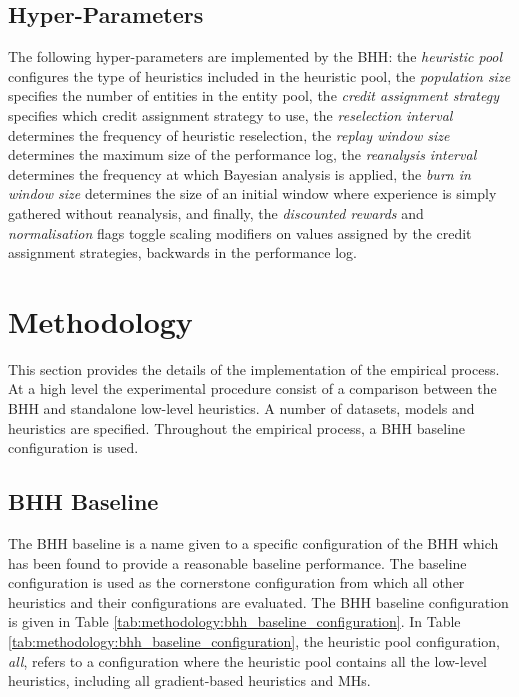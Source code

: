 \documentclass[preprint,review,12pt]{elsarticle}
\begin{document}
\subsection{Hyper-Parameters}\label{sec:bhh:hyper_parameters}

The following hyper-parameters are implemented by the \acs{BHH}: the \textit{heuristic pool} configures the type of heuristics included in the heuristic pool, the \textit{population size} specifies the number of entities in the entity pool, the \textit{credit assignment strategy} specifies which credit assignment strategy to use, the \textit{reselection interval} determines the frequency of heuristic reselection, the \textit{replay window size} determines the maximum size of the performance log, the \textit{reanalysis interval} determines the frequency at which Bayesian analysis is applied, the \textit{burn in window size} determines the size of an initial window where experience is simply gathered without reanalysis, and finally, the \textit{discounted rewards} and \textit{normalisation} flags toggle scaling modifiers on values assigned by the credit assignment strategies, backwards in the performance log.



\section{Methodology}
\label{sec:methodology}

This section provides the details of the implementation of the empirical process. At a high level the experimental procedure consist of a comparison between the \acs{BHH} and standalone low-level heuristics. A number of datasets, models and heuristics are specified. Throughout the empirical process, a \acs{BHH} baseline configuration is used.

\subsection{BHH Baseline}\label{sec:methodology:baseline_bhh}

The \acs{BHH} baseline is a name given to a specific configuration of the \acs{BHH} which has been found to provide a reasonable baseline performance. The baseline configuration is used as the cornerstone configuration from which all other heuristics and their configurations are evaluated. The \acs{BHH} baseline configuration is given in Table \ref{tab:methodology:bhh_baseline_configuration}. In Table \ref{tab:methodology:bhh_baseline_configuration}, the heuristic pool configuration, \textit{all}, refers to a configuration where the heuristic pool contains all the low-level heuristics, including all gradient-based heuristics and \acp{MH}.
\end{document}
